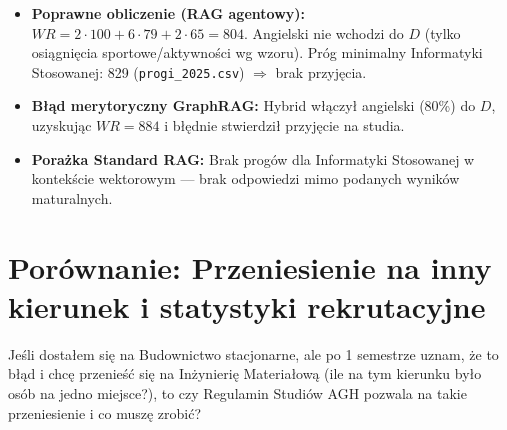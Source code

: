 \begin{tcolorbox}[colback=red!5!white,colframe=red!50!black,title=Wnioski i obserwacje]
    \begin{itemize}
        \item \textbf{Poprawne obliczenie (RAG agentowy):} $WR = 2 \cdot 100 + 6 \cdot 79 + 2 \cdot 65 = 804$. Angielski nie wchodzi do $D$ (tylko osiągnięcia sportowe/aktywności wg wzoru). Próg minimalny Informatyki Stosowanej: 829 (\texttt{progi\_2025.csv}) $\Rightarrow$ brak przyjęcia.
        \item \textbf{Błąd merytoryczny GraphRAG:} Hybrid włączył angielski (80\%) do $D$, uzyskując $WR = 884$ i błędnie stwierdził przyjęcie na studia.
        \item \textbf{Porażka Standard RAG:} Brak progów dla Informatyki Stosowanej w kontekście wektorowym --- brak odpowiedzi mimo podanych wyników maturalnych.
    \end{itemize}
\end{tcolorbox}
\vspace{1em}

\newpage
\section*{Porównanie: Przeniesienie na inny kierunek i statystyki rekrutacyjne}

\begin{tcolorbox}[colback=blue!5!white,colframe=blue!75!black,title=Pytanie użytkownika]
    Jeśli dostałem się na Budownictwo stacjonarne, ale po 1 semestrze uznam, że to błąd i chcę przenieść się na Inżynierię Materiałową (ile na tym kierunku było osób na jedno miejsce?), to czy Regulamin Studiów AGH pozwala na takie przeniesienie i co muszę zrobić?
\end{tcolorbox}


